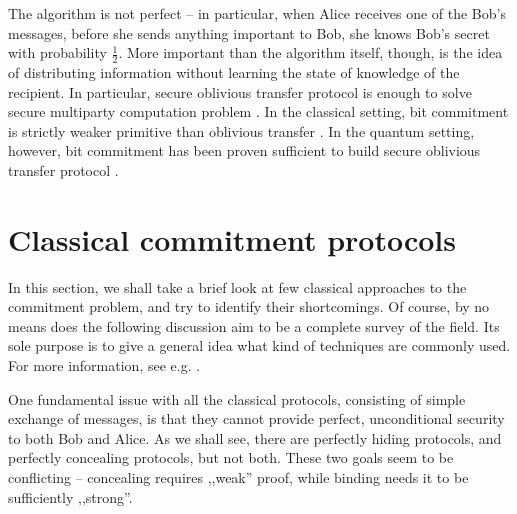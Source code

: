 \documentclass[10pt]{article}
\begin{document}
The algorithm is not perfect -- in particular, when Alice receives one of the Bob's messages, before
she sends anything important to Bob, she knows Bob's secret with probability \(\frac{1}{2}\). More
important than the algorithm itself, though, is the idea of distributing information without learning
the state of knowledge of the recipient. In particular, secure oblivious transfer protocol is enough
to solve secure multiparty computation problem \cite{Kilian88}. In the classical setting, bit commitment
is strictly weaker primitive than oblivious transfer \cite{Brassard88}. In the quantum setting, however,
bit commitment has been proven sufficient to build secure oblivious transfer protocol 
\cite{Crepeau88,Bennet92,Yao95,Damgard09}.
\footnotemark



\section{Classical commitment protocols}

In this section, we shall take a brief look at few classical approaches to the commitment problem,
and try to identify their shortcomings. Of course, by no means does the following discussion aim
to be a complete survey of the field. Its sole purpose is to give a general idea what kind of 
techniques are commonly used. For more information, see e.g. \cite{Brassard88,Naor91,Naor98,Damgard02}.

One fundamental issue with all the classical protocols, consisting of simple exchange of messages,
is that they cannot provide perfect, unconditional security to both Bob and Alice. As we shall see,
there are perfectly hiding protocols, and perfectly concealing protocols, but not both. These two
goals seem to be conflicting -- concealing requires ,,weak'' proof, while binding needs it to be
sufficiently ,,strong''.
\end{document}

